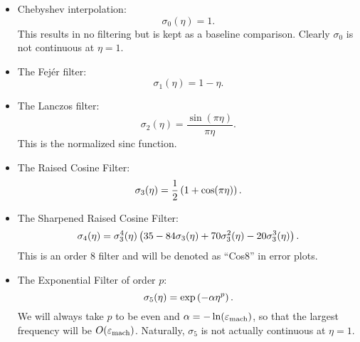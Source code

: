 \begin{itemize}
\item Chebyshev interpolation:
%
\begin{equation}
    \sigma_{0}(\eta) = 1.
\end{equation}
%
This results in no filtering but is kept as a baseline comparison.
Clearly $\sigma_{0}$ is not continuous at $\eta=1$.

\item The Fej\'{e}r filter:
%
\begin{equation}
    \sigma_{1}(\eta) = 1 - \eta.
\end{equation}

\item The Lanczos filter:
%
\begin{equation}
    \sigma_{2}(\eta) = \frac{\sin(\pi\eta)}{\pi\eta}.
\end{equation}
%
This is the normalized sinc function.

\item The Raised Cosine Filter:
%
\begin{equation}
    \sigma_{3}(\eta) = \frac{1}{2}\left( 1 + \cos(\pi\eta) \right).
\end{equation}

\item The Sharpened Raised Cosine Filter:
%
\begin{equation}
    \sigma_{4}(\eta) = \sigma_{3}^{4}(\eta)\left( 
        35 - 84\sigma_{3}(\eta) + 70\sigma_{3}^{2}(\eta)
        - 20\sigma_{3}^{3}(\eta) \right).
\end{equation}
%
This is an order 8 filter and will be denoted as ``Cos8'' in error plots.

\item The Exponential Filter of order $p$:
%
\begin{equation}
    \sigma_{5}(\eta) = \exp\left( -\alpha\eta^{p} \right).
\end{equation}
%
We will always take $p$ to be even and $\alpha = -\ln(\varepsilon_{\text{mach}})$,
so that the largest frequency will be $O(\varepsilon_{\text{mach}})$.
Naturally, $\sigma_{5}$ is not actually continuous at $\eta=1$.
\end{itemize}
